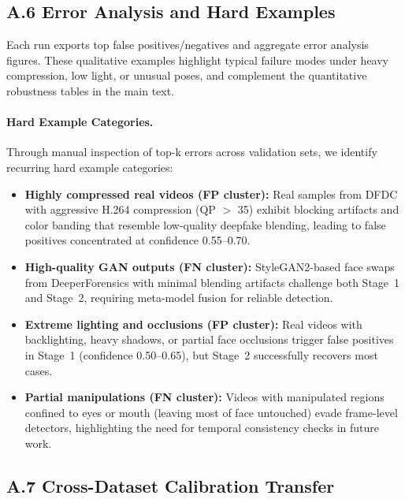 \subsection*{A.6 Error Analysis and Hard Examples}

Each run exports top false positives/negatives and aggregate error analysis figures. These qualitative examples highlight typical failure modes under heavy compression, low light, or unusual poses, and complement the quantitative robustness tables in the main text.

\paragraph{Hard Example Categories.}
Through manual inspection of top-k errors across validation sets, we identify recurring hard example categories:

\begin{itemize}[leftmargin=*,itemsep=2pt,parsep=0pt]
  \item \textbf{Highly compressed real videos (FP cluster):} Real samples from DFDC with aggressive H.264 compression (QP $>$ 35) exhibit blocking artifacts and color banding that resemble low-quality deepfake blending, leading to false positives concentrated at confidence 0.55--0.70.

  \item \textbf{High-quality GAN outputs (FN cluster):} StyleGAN2-based face swaps from DeeperForensics with minimal blending artifacts challenge both Stage~1 and Stage~2, requiring meta-model fusion for reliable detection.

  \item \textbf{Extreme lighting and occlusions (FP cluster):} Real videos with backlighting, heavy shadows, or partial face occlusions trigger false positives in Stage~1 (confidence 0.50--0.65), but Stage~2 successfully recovers most cases.

  \item \textbf{Partial manipulations (FN cluster):} Videos with manipulated regions confined to eyes or mouth (leaving most of face untouched) evade frame-level detectors, highlighting the need for temporal consistency checks in future work.
\end{itemize}

\subsection*{A.7 Cross-Dataset Calibration Transfer}

